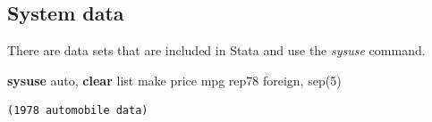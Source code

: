 \documentclass[
]{book}
\newenvironment{Shaded}{\begin{snugshade}}{\end{snugshade}}
\newcommand{\KeywordTok}[1]{\textcolor[rgb]{0.13,0.29,0.53}{\textbf{#1}}}
\newcommand{\NormalTok}[1]{#1}
\newcommand{\OtherTok}[1]{\textcolor[rgb]{0.56,0.35,0.01}{#1}}
\begin{document}
\subsection{System data}\label{system-data}

There are data sets that are included in Stata and use the \emph{sysuse} command.

\begin{Shaded}
\begin{Highlighting}[]
\KeywordTok{sysuse}\NormalTok{ auto, }\KeywordTok{clear}
\OtherTok{list}\NormalTok{ make price mpg rep78 foreign, sep(5)}
\end{Highlighting}
\end{Shaded}

\begin{verbatim}
(1978 automobile data)


\end{verbatim}
\end{document}
